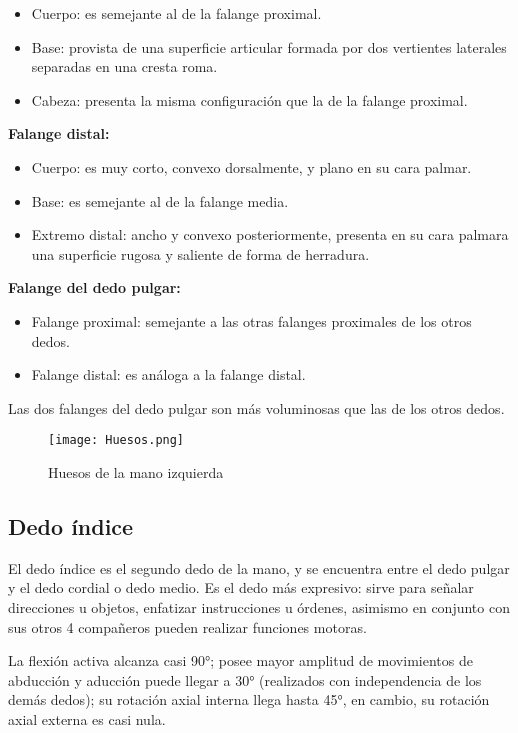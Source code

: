 \documentclass{article}
\begin{document}
\begin{itemize}
\item Cuerpo: es semejante al de la falange proximal.
\item Base: provista de una superficie articular formada por dos vertientes laterales separadas en una cresta roma.
\item Cabeza: presenta la misma configuración que la de la falange proximal.
\end{itemize}
\textbf{Falange distal:}

\begin{itemize}
\item Cuerpo: es muy corto, convexo dorsalmente, y plano en su cara palmar.
\item Base: es semejante al de la falange media.
\item Extremo distal: ancho y convexo posteriormente, presenta en su cara palmara una superficie rugosa y saliente de forma de herradura.
\end{itemize}
\textbf{Falange del dedo pulgar:}

\begin{itemize}
\item Falange proximal: semejante a las otras falanges proximales de los otros dedos.
\item Falange distal: es análoga a la falange distal.
\end{itemize}
Las dos falanges del dedo pulgar son más voluminosas que las de los otros dedos.

\begin{figure} [htp]%
    \centering
    \texttt{[image: Huesos.png]} %
    \caption{Huesos de la mano izquierda}
    \label{grafica}
\end{figure}

\newpage
\subsection{\textbf{Dedo índice}}

El dedo índice es el segundo dedo de la mano, y se encuentra entre el dedo pulgar y el dedo cordial o dedo medio. Es el dedo más expresivo: sirve para señalar direcciones u objetos, enfatizar instrucciones u órdenes, asimismo en conjunto con sus otros 4 compañeros pueden realizar funciones motoras.

La flexión activa alcanza casi 90°; posee mayor amplitud de movimientos de abducción y aducción puede llegar a 30° (realizados con independencia de los demás dedos); su rotación axial interna llega hasta 45°, en cambio, su rotación axial externa es casi nula\cite{voegeli2000lecciones}.
\end{document}
